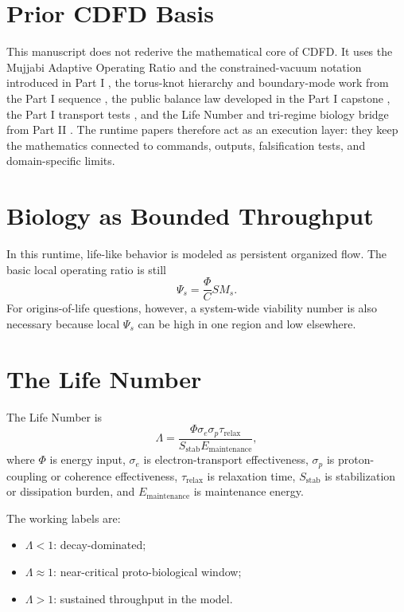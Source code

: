\documentclass[12pt,a4paper]{article}
\begin{document}
\section{Prior CDFD Basis}
This manuscript does not rederive the mathematical core of CDFD. It uses the
Mujjabi Adaptive Operating Ratio and the constrained-vacuum notation introduced
in Part I \cite{MujjabiI2026}, the torus-knot hierarchy and boundary-mode work
from the Part I sequence \cite{MujjabiVI2026,MujjabiIX2026}, the public balance
law developed in the Part I capstone \cite{MujjabiX2026}, the Part I transport
tests \cite{MujjabiXII2026}, and the Life Number and tri-regime biology bridge
from Part II \cite{MujjabiPartII2026}. The runtime papers therefore act as an
execution layer: they keep the mathematics connected to commands, outputs,
falsification tests, and domain-specific limits.


\section{Biology as Bounded Throughput}
In this runtime, life-like behavior is modeled as persistent organized flow.
The basic local operating ratio is still
\begin{equation}
    \Psi_s=\frac{\Phi}{C}S M_s.
\end{equation}
For origins-of-life questions, however, a system-wide viability number is also
necessary because local $\Psi_s$ can be high in one region and low elsewhere.

\section{The Life Number}
The Life Number is
\begin{equation}
    \Lambda =
    \frac{\Phi \sigma_e \sigma_p \tau_{\mathrm{relax}}}
    {S_{\mathrm{stab}}E_{\mathrm{maintenance}}},
\end{equation}
where $\Phi$ is energy input, $\sigma_e$ is electron-transport effectiveness,
$\sigma_p$ is proton-coupling or coherence effectiveness,
$\tau_{\mathrm{relax}}$ is relaxation time, $S_{\mathrm{stab}}$ is stabilization
or dissipation burden, and $E_{\mathrm{maintenance}}$ is maintenance energy.

The working labels are:
\begin{itemize}
    \item $\Lambda<1$: decay-dominated;
    \item $\Lambda\approx1$: near-critical proto-biological window;
    \item $\Lambda>1$: sustained throughput in the model.
\end{itemize}
\end{document}
